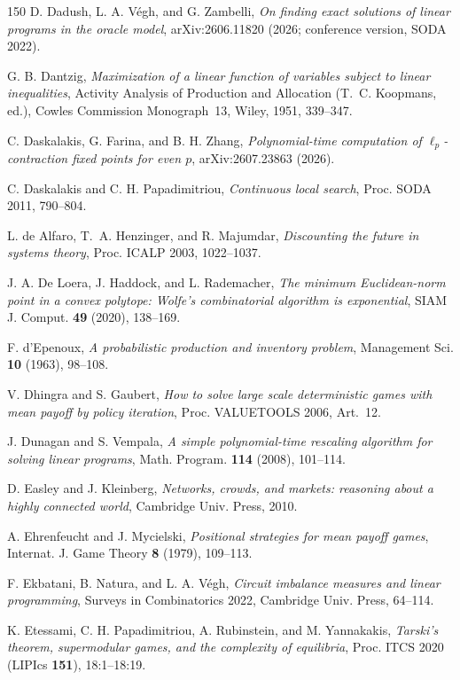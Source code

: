 \begin{thebibliography}{150}
D. Dadush, L. A. V\'egh, and G. Zambelli, \emph{On finding exact solutions of linear programs in the oracle model}, arXiv:2606.11820 (2026; conference version, SODA 2022).

G. B. Dantzig, \emph{Maximization of a linear function of variables subject to linear inequalities}, Activity Analysis of Production and Allocation (T.~C. Koopmans, ed.), Cowles Commission Monograph~13, Wiley, 1951, 339--347.

C. Daskalakis, G. Farina, and B. H. Zhang, \emph{Polynomial-time computation of \(\ell_p\)-contraction fixed points for even \(p\)}, arXiv:2607.23863 (2026).

C. Daskalakis and C. H. Papadimitriou, \emph{Continuous local search}, Proc. SODA 2011, 790--804.

L. de Alfaro, T.~A. Henzinger, and R. Majumdar, \emph{Discounting the future in systems theory}, Proc. ICALP 2003, 1022--1037.

J. A. De Loera, J. Haddock, and L. Rademacher, \emph{The minimum Euclidean-norm point in a convex polytope: Wolfe's combinatorial algorithm is exponential}, SIAM J. Comput. \textbf{49} (2020), 138--169.

F. d'Epenoux, \emph{A probabilistic production and inventory problem}, Management Sci. \textbf{10} (1963), 98--108.

V. Dhingra and S. Gaubert, \emph{How to solve large scale deterministic games with mean payoff by policy iteration}, Proc. VALUETOOLS 2006, Art.~12.

J. Dunagan and S. Vempala, \emph{A simple polynomial-time rescaling algorithm for solving linear programs}, Math. Program. \textbf{114} (2008), 101--114.

D. Easley and J. Kleinberg, \emph{Networks, crowds, and markets: reasoning about a highly connected world}, Cambridge Univ. Press, 2010.

A. Ehrenfeucht and J. Mycielski, \emph{Positional strategies for mean payoff games}, Internat. J. Game Theory \textbf{8} (1979), 109--113.

F. Ekbatani, B. Natura, and L. A. V\'egh, \emph{Circuit imbalance measures and linear programming}, Surveys in Combinatorics 2022, Cambridge Univ. Press, 64--114.

K. Etessami, C. H. Papadimitriou, A. Rubinstein, and M. Yannakakis, \emph{Tarski's theorem, supermodular games, and the complexity of equilibria}, Proc. ITCS 2020 (LIPIcs \textbf{151}), 18:1--18:19.


\end{thebibliography}
